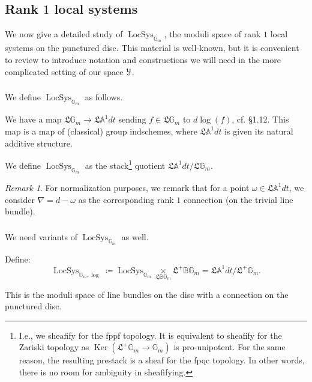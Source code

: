 \documentclass[reqno,11pt]{amsart}
\numberwithin{equation}{subsection}
\theoremstyle{remark}
\newtheorem{rem}[thm]{Remark}
\newcommand{\bA}{{\mathbb A}}
\newcommand{\bB}{{\mathbb B}}
\newcommand{\bG}{{\mathbb G}}
\newcommand{\sY}{{\EuScript Y}}
\newcommand{\fL}{{\mathfrak L}}
\newcommand{\on}{\operatorname}
\newcommand{\Ker}{\on{Ker}}
\newcommand{\LocSys}{\on{LocSys}}
\begin{document}
\subsection{Rank $1$ local systems}\label{ss:rk1-ls}

We now give a detailed study of $\LocSys_{\bG_m}$, the moduli space of 
rank $1$ local systems on the punctured disc. This material is well-known,
but it is convenient to review to introduce notation and constructions
we will need in the more complicated setting of our space $\sY$.

\subsubsection{}

We define $\LocSys_{\bG_m}$ as follows.

We have a map $\fL \bG_m \to \fL \bA^1 dt$ sending
$f \in \fL \bG_m$ to $d\log(f)$, cf. \cite{locsys} \S 1.12.
This map is a map of (classical) group indschemes, where
$\fL \bA^1 dt$ is given its natural additive structure.

We define $\LocSys_{\bG_m}$ as the stack\footnote{I.e., we sheafify
for the fppf topology. It is equivalent to sheafify for the 
Zariski topology as $\Ker(\fL^+ \bG_m \to \bG_m)$ is pro-unipotent.
For the same reason, the resulting prestack is a sheaf for the 
fpqc topology. In other words, there is no room for ambiguity in 
sheafifying.}
quotient $\fL \bA^1 dt/\fL \bG_m$. 

\begin{rem}

For normalization purposes, we remark that for 
a point $\omega \in \fL \bA^1 dt$, we consider 
$\nabla = d - \omega$ as the corresponding rank $1$ connection
(on the trivial line bundle).

\end{rem}

\subsubsection{}

We need variants of $\LocSys_{\bG_m}$ as well.

Define:
%
\[
\LocSys_{\bG_m,\log} \coloneqq 
\LocSys_{\bG_m} \underset{\fL \bB\bG_m}{\times} \fL^+ \bB \bG_m = 
\fL \bA^1 dt/\fL^+ \bG_m.
\]

\noindent This is the moduli space of line bundles on the
disc with a connection on the punctured disc. 
\end{document}
